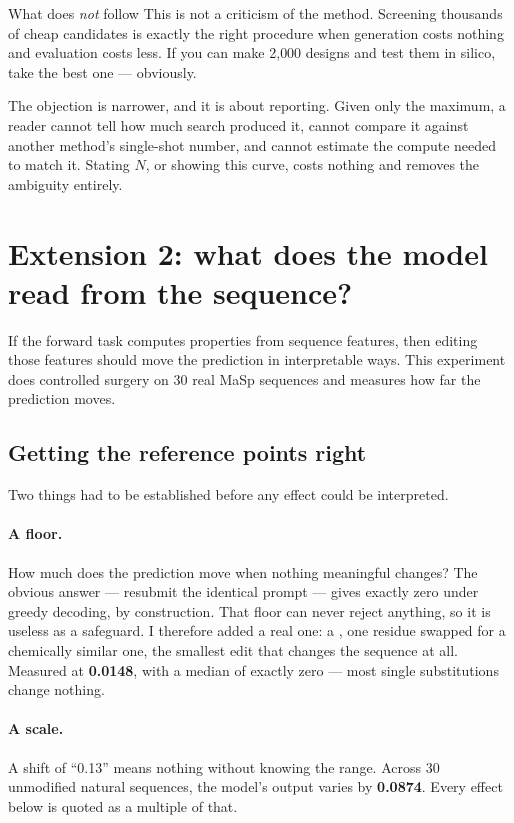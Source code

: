\begin{keybox}{What does \emph{not} follow}
This is not a criticism of the method. Screening thousands of cheap candidates
is exactly the right procedure when generation costs nothing and evaluation
costs less. If you can make 2{,}000 designs and test them in silico, take the
best one --- obviously.

The objection is narrower, and it is about reporting. Given only the maximum, a
reader cannot tell how much search produced it, cannot compare it against
another method's single-shot number, and cannot estimate the compute needed to
match it. Stating $N$, or showing this curve, costs nothing and removes the
ambiguity entirely.
\end{keybox}

\section{Extension 2: what does the model read from the sequence?}
\label{sec:ablations}

If the forward task computes properties from sequence features, then editing
those features should move the prediction in interpretable ways. This
experiment does controlled surgery on 30 real MaSp sequences and measures how
far the prediction moves.

\subsection{Getting the reference points right}

Two things had to be established before any effect could be interpreted.

\paragraph{A floor.} How much does the prediction move when nothing
meaningful changes? The obvious answer --- resubmit the identical prompt --- gives
exactly zero under greedy decoding, by construction. That floor can never
reject anything, so it is useless as a safeguard. I therefore added a real one:
a , one residue swapped for a chemically
similar one, the smallest edit that changes the sequence at all. Measured at
\textbf{0.0148}, with a median of exactly zero --- most single substitutions
change nothing.

\paragraph{A scale.} A shift of ``0.13'' means nothing without knowing the
range. Across 30 unmodified natural sequences, the model's output varies by
\textbf{0.0874}. Every effect below is quoted as a multiple of that.

